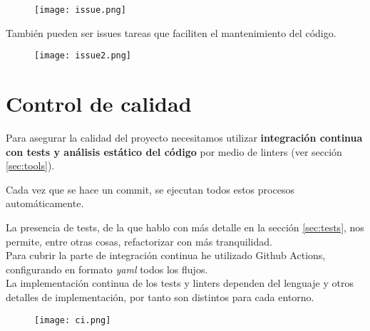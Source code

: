 \begin{figure}[H]
	\centering	
	\texttt{[image: issue.png]}
	\end{figure}

	También pueden ser issues tareas que faciliten el mantenimiento del código.

\begin{figure}[H]
	\centering	
	\texttt{[image: issue2.png]}
	\end{figure}


\section{Control de calidad}\label{sec:cal}

Para asegurar la calidad del proyecto necesitamos utilizar \textbf{integración continua con tests y análisis estático del código} por medio de linters (ver sección \ref{sec:tools}).


Cada vez que se hace un commit, se ejecutan todos estos procesos automáticamente.

La presencia de tests, de la que hablo con más detalle en la sección \ref{sec:tests}, nos permite, entre otras cosas, refactorizar con más 
tranquilidad. \\

Para cubrir la parte de integración continua he utilizado Github Actions,  configurando en formato \textit{yaml} todos los flujos.\\
La implementación continua de los tests y linters dependen del lenguaje y otros detalles de implementación, por tanto
son distintos para cada entorno.
\begin{figure}[H]
	\centering	
	\texttt{[image: ci.png]}
	\end{figure}



